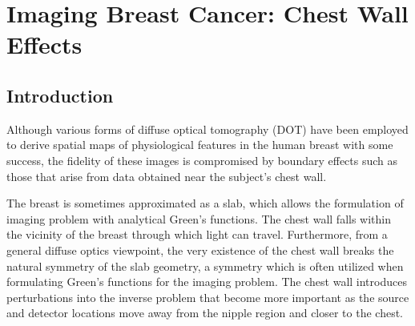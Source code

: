 
\chapter{Imaging Breast Cancer: Chest Wall Effects}
\label{Chap:3_chestwall}
\vspace{-5mm}
\section{Introduction}
\vspace{-5mm}
Although various forms of diffuse optical tomography (DOT) have been employed to derive spatial maps of physiological features in the human breast with some success, the fidelity of these images is compromised by boundary effects such as those that arise from data obtained near the subject's chest wall. 

The breast is sometimes approximated as a slab, which allows the formulation of imaging problem with analytical Green's functions. The chest wall falls within the vicinity of the breast through which light can travel. Furthermore, from a general diffuse optics viewpoint, the very existence of the chest wall breaks the natural symmetry of the slab geometry, a symmetry which is often utilized when formulating Green's functions for the imaging problem. The chest wall introduces perturbations into the inverse problem that become more important as the source and detector locations move away from the nipple region and closer to the chest.

